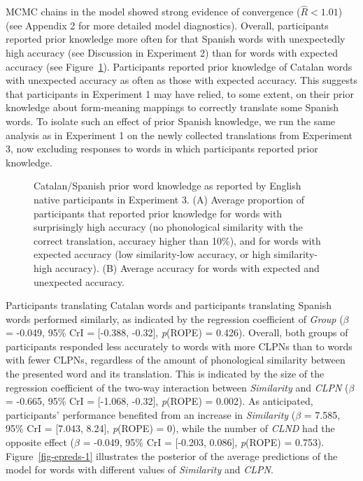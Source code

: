 \documentclass[
]{article}
\makeatletter
\newcommand*\pandocbounded[1]{%
  \sbox\pandoc@box{#1}%
  \Gscale@div\@tempa{\textheight}{\dimexpr\ht\pandoc@box+\dp\pandoc@box\relax}%
  \Gscale@div\@tempb{\linewidth}{\wd\pandoc@box}%
  \ifdim\@tempb\p@<\@tempa\p@\let\@tempa\@tempb\fi%
  \ifdim\@tempa\p@<\p@\scalebox{\@tempa}{\usebox\pandoc@box}%
  \else\usebox{\pandoc@box}%
  \fi%
}
\makeatother
\begin{document}
MCMC chains in the model showed strong evidence of convergence
(\(\hat{R}<1.01\)) (see Appendix 2 for more detailed model diagnostics).
Overall, participants reported prior knowledge more often for that
Spanish words with unexpectedly high accuracy (see Discussion in
Experiment 2) than for words with expected accuracy (see
Figure~\ref{fig-knowledge}). Participants reported prior knowledge of
Catalan words with unexpected accuracy as often as those with expected
accuracy. This suggests that participants in Experiment 1 may have
relied, to some extent, on their prior knowledge about form-meaning
mappings to correctly translate some Spanish words. To isolate such an
effect of prior Spanish knowledge, we run the same analysis as in
Experiment 1 on the newly collected translations from Experiment 3, now
excluding responses to words in which participants reported prior
knowledge.

\begin{figure}

\centering{

\pandocbounded{\texttt{[image: manuscript\_files/figure-pdf/fig-knowledge-1.pdf]}}

}

\caption{\label{fig-knowledge}Catalan/Spanish prior word knowledge as
reported by English native participants in Experiment 3. (A) Average
proportion of participants that reported prior knowledge for words with
surprisingly high accuracy (no phonological similarity with the correct
translation, accuracy higher than 10\%), and for words with expected
accuracy (low similarity-low accuracy, or high similarity-high
accuracy). (B) Average accuracy for words with expected and unexpected
accuracy.}

\end{figure}%

Participants translating Catalan words and participants translating
Spanish words performed similarly, as indicated by the regression
coefficient of \emph{Group} (\(\beta\) = -0.049, 95\% CrI = {[}-0.388,
-0.32{]}, \emph{p}(ROPE) = 0.426). Overall, both groups of participants
responded less accurately to words with more CLPNs than to words with
fewer CLPNs, regardless of the amount of phonological similarity between
the presented word and its translation. This is indicated by the size of
the regression coefficient of the two-way interaction between
\emph{Similarity} and \emph{CLPN} (\(\beta\) = -0.665, 95\% CrI =
{[}-1.068, -0.32{]}, \emph{p}(ROPE) = 0.002). As anticipated,
participants' performance benefited from an increase in
\emph{Similarity} (\(\beta\) = 7.585, 95\% CrI = {[}7.043, 8.24{]},
\emph{p}(ROPE) = 0), while the number of \emph{CLND} had the opposite
effect (\(\beta\) = -0.049, 95\% CrI = {[}-0.203, 0.086{]},
\emph{p}(ROPE) = 0.753). Figure~\ref{fig-epreds-1} illustrates the
posterior of the average predictions of the model for words with
different values of \emph{Similarity} and \emph{CLPN}.
\end{document}
